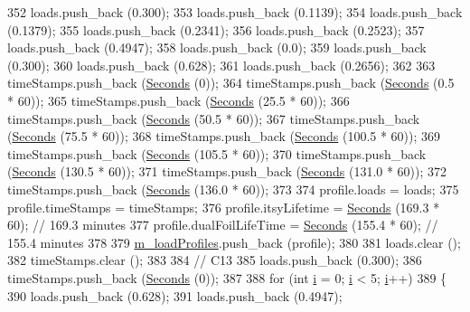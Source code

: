 \begin{DoxyCode}
352   loads.push\_back (0.300);
353   loads.push\_back (0.1139);
354   loads.push\_back (0.1379);
355   loads.push\_back (0.2341);
356   loads.push\_back (0.2523);
357   loads.push\_back (0.4947);
358   loads.push\_back (0.0);
359   loads.push\_back (0.300);
360   loads.push\_back (0.628);
361   loads.push\_back (0.2656);
362 
363   timeStamps.push\_back (\hyperlink{group__timecivil_ga33c34b816f8ff6628e33d5c8e9713b9e}{Seconds} (0));
364   timeStamps.push\_back (\hyperlink{group__timecivil_ga33c34b816f8ff6628e33d5c8e9713b9e}{Seconds} (0.5 * 60));
365   timeStamps.push\_back (\hyperlink{group__timecivil_ga33c34b816f8ff6628e33d5c8e9713b9e}{Seconds} (25.5 * 60));
366   timeStamps.push\_back (\hyperlink{group__timecivil_ga33c34b816f8ff6628e33d5c8e9713b9e}{Seconds} (50.5 * 60));
367   timeStamps.push\_back (\hyperlink{group__timecivil_ga33c34b816f8ff6628e33d5c8e9713b9e}{Seconds} (75.5 * 60));
368   timeStamps.push\_back (\hyperlink{group__timecivil_ga33c34b816f8ff6628e33d5c8e9713b9e}{Seconds} (100.5 * 60));
369   timeStamps.push\_back (\hyperlink{group__timecivil_ga33c34b816f8ff6628e33d5c8e9713b9e}{Seconds} (105.5 * 60));
370   timeStamps.push\_back (\hyperlink{group__timecivil_ga33c34b816f8ff6628e33d5c8e9713b9e}{Seconds} (130.5 * 60));
371   timeStamps.push\_back (\hyperlink{group__timecivil_ga33c34b816f8ff6628e33d5c8e9713b9e}{Seconds} (131.0 * 60));
372   timeStamps.push\_back (\hyperlink{group__timecivil_ga33c34b816f8ff6628e33d5c8e9713b9e}{Seconds} (136.0 * 60));
373 
374   profile.loads = loads;
375   profile.timeStamps = timeStamps;
376   profile.itsyLifetime = \hyperlink{group__timecivil_ga33c34b816f8ff6628e33d5c8e9713b9e}{Seconds} (169.3 * 60);      \textcolor{comment}{// 169.3 minutes}
377   profile.dualFoilLifeTime = \hyperlink{group__timecivil_ga33c34b816f8ff6628e33d5c8e9713b9e}{Seconds} (155.4 * 60);  \textcolor{comment}{// 155.4 minutes}
378 
379   \hyperlink{classBatteryLifetimeTest_aee9ad324da18f58ee75689778580c3fb}{m\_loadProfiles}.push\_back (profile);
380 
381   loads.clear ();
382   timeStamps.clear ();
383 
384   \textcolor{comment}{// C13}
385   loads.push\_back (0.300);
386   timeStamps.push\_back (\hyperlink{group__timecivil_ga33c34b816f8ff6628e33d5c8e9713b9e}{Seconds} (0));
387 
388   \textcolor{keywordflow}{for} (\textcolor{keywordtype}{int} \hyperlink{bernuolliDistribution_8m_a6f6ccfcf58b31cb6412107d9d5281426}{i} = 0; \hyperlink{bernuolliDistribution_8m_a6f6ccfcf58b31cb6412107d9d5281426}{i} < 5; \hyperlink{bernuolliDistribution_8m_a6f6ccfcf58b31cb6412107d9d5281426}{i}++)
389     \{
390       loads.push\_back (0.628);
391       loads.push\_back (0.4947);

\end{DoxyCode}
